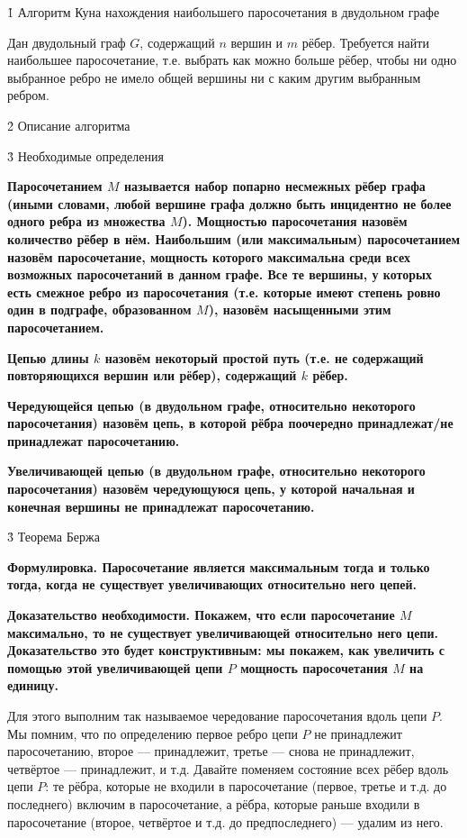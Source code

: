 \h1{ Алгоритм Куна нахождения наибольшего паросочетания в двудольном графе }

Дан двудольный граф $G$, содержащий $n$ вершин и $m$ рёбер. Требуется найти наибольшее паросочетание, т.е. выбрать как можно больше рёбер, чтобы ни одно выбранное ребро не имело общей вершины ни с каким другим выбранным ребром.


\h2{ Описание алгоритма }


\h3{ Необходимые определения }

\bf{Паросочетанием} $M$ называется набор попарно несмежных рёбер графа (иными словами, любой вершине графа должно быть инцидентно не более одного ребра из множества $M$). Мощностью паросочетания назовём количество рёбер в нём. Наибольшим (или максимальным) паросочетанием назовём паросочетание, мощность которого максимальна среди всех возможных паросочетаний в данном графе. Все те вершины, у которых есть смежное ребро из паросочетания (т.е. которые имеют степень ровно один в подграфе, образованном $M$), назовём насыщенными этим паросочетанием.

\bf{Цепью} длины $k$ назовём некоторый простой путь (т.е. не содержащий повторяющихся вершин или рёбер), содержащий $k$ рёбер.

\bf{Чередующейся цепью} (в двудольном графе, относительно некоторого паросочетания) назовём цепь, в которой рёбра поочередно принадлежат/не принадлежат паросочетанию.

\bf{Увеличивающей цепью} (в двудольном графе, относительно некоторого паросочетания) назовём чередующуюся цепь, у которой начальная и конечная вершины не принадлежат паросочетанию.


\h3{ Теорема Бержа }

\bf{Формулировка}. Паросочетание является максимальным тогда и только тогда, когда не существует увеличивающих относительно него цепей.

\bf{Доказательство необходимости}. Покажем, что если паросочетание $M$ максимально, то не существует увеличивающей относительно него цепи. Доказательство это будет конструктивным: мы покажем, как увеличить с помощью этой увеличивающей цепи $P$ мощность паросочетания $M$ на единицу.

Для этого выполним так называемое чередование паросочетания вдоль цепи $P$. Мы помним, что по определению первое ребро цепи $P$ не принадлежит паросочетанию, второе --- принадлежит, третье --- снова не принадлежит, четвёртое --- принадлежит, и т.д. Давайте поменяем состояние всех рёбер вдоль цепи $P$: те рёбра, которые не входили в паросочетание (первое, третье и т.д. до последнего) включим в паросочетание, а рёбра, которые раньше входили в паросочетание (второе, четвёртое и т.д. до предпоследнего) --- удалим из него.

